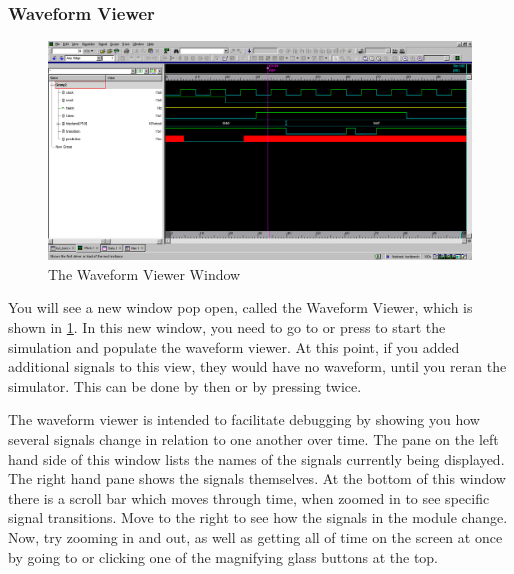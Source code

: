 \documentclass[dvipsnames]{article}
\begin{document}
\subsubsection{Waveform Viewer}
\begin{figure}[H]
	\includegraphics[width=\textwidth]{waveform-viewer}
	\caption{The Waveform Viewer Window}
	\label{fig:waveform}
\end{figure}

You will see a new window pop open, called the Waveform Viewer, which is shown
in \cref{fig:waveform}. In this new window, you need to go to
 or press  to start the simulation and 
populate the waveform viewer. At this point, if you added additional signals to
this view, they would have no waveform, until you reran the simulator. This can
be done by  then  or by
pressing  twice. 

The waveform viewer is intended to facilitate debugging by showing you how
several signals change in relation to one another over time. The pane on the
left hand side of this window lists the names of the signals currently being
displayed. The right hand pane shows the signals themselves. At the bottom of
this window there is a scroll bar which moves through time, when zoomed in to
see specific signal transitions. Move to the right to see how the signals in the
module change. Now, try zooming in and out, as well as getting all of time on
the screen at once by going to  or clicking one of the 
magnifying glass buttons at the top. 
\end{document}
